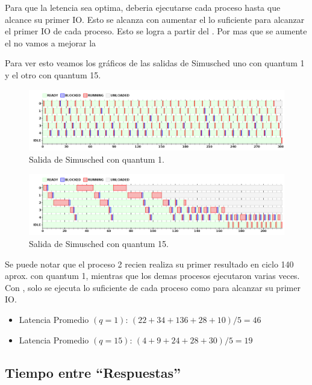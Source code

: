 Para que la letencia sea optima, deberia ejecutarse cada proceso hasta que alcance su primer IO. Esto se alcanza con aumentar el \quantum lo suficiente para alcanzar el primer IO de cada proceso. Esto se logra a partir del . Por mas que se aumente el \quantum no vamos a mejorar la \latencia


Para ver esto veamos los gr\'aficos de las salidas de Simusched uno con quantum 1 y el otro con quantum 15.

\begin{figure}[H]
  \centering
    \includegraphics[width=1\textwidth]{img/SchedRRTest1.png}
    \caption{Salida de Simusched con quantum 1.}
\end{figure}

\begin{figure}[H]
  \centering
    \includegraphics[width=1\textwidth]{img/SchedRRTest15.png}
    \caption{Salida de Simusched con quantum 15.}
\end{figure}

Se puede notar que el proceso 2 recien realiza su primer resultado en ciclo 140 aprox. con quantum 1, mientras que los demas procesos ejecutaron varias veces.\\
Con , solo se ejecuta lo suficiente de cada proceso como para alcanzar su primer IO.

\begin{itemize}
 \item Latencia Promedio $(q=1)$: $(22+34+136+28+10)/5 = 46$
 \item Latencia Promedio $(q=15)$: $(4 + 9 + 24 + 28 + 30) / 5 = 19$
\end{itemize}

\subsection{Tiempo entre ``Respuestas'' }

